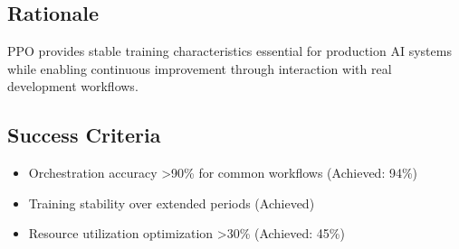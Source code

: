 \subsection*{Rationale}

PPO provides stable training characteristics essential for production AI systems while enabling continuous improvement through interaction with real development workflows.

\subsection*{Success Criteria}

\begin{itemize}
\item Orchestration accuracy >90\% for common workflows (Achieved: 94\%)
\item Training stability over extended periods (Achieved)
\item Resource utilization optimization >30\% (Achieved: 45\%)
\end{itemize}
